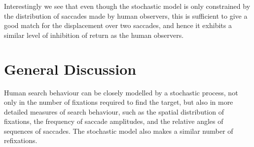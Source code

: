 \documentclass[preprint, authoryear]{elsarticle} %
\begin{document}
Interestingly we see that even though the stochastic model is only constrained by the distribution of saccades made by human observers, this is sufficient to give a good match for the displacement over two saccades, and hence it exhibits a similar level of inhibition of return as the human observers. 

\section{General Discussion}

Human search behaviour can be closely modelled by a stochastic process, not only in the number of fixations required to find the target, but also in more detailed measures of search behaviour, such as the spatial distribution of fixations, the frequency of saccade amplitudes, and the relative angles of sequences of saccades. The stochastic model also makes a similar number of refixations.

\par
\end{document}
